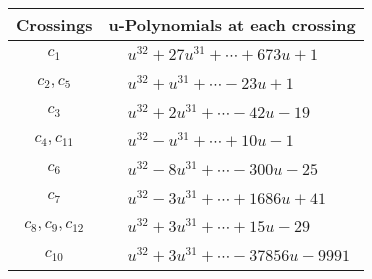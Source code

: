 \documentclass[1p]{elsarticle_modified}
\theoremstyle{definition}
\begin{document}
\begin{tabular}{m{50pt}|m{274pt}}
Crossings & \hspace{64pt}u-Polynomials at each crossing \\
\hline $$\begin{aligned}c_{1}\end{aligned}$$&$\begin{aligned}
&u^{32}+27 u^{31}+\cdots+673 u+1
\end{aligned}$\\
\hline $$\begin{aligned}c_{2},c_{5}\end{aligned}$$&$\begin{aligned}
&u^{32}+u^{31}+\cdots-23 u+1
\end{aligned}$\\
\hline $$\begin{aligned}c_{3}\end{aligned}$$&$\begin{aligned}
&u^{32}+2 u^{31}+\cdots-42 u-19
\end{aligned}$\\
\hline $$\begin{aligned}c_{4},c_{11}\end{aligned}$$&$\begin{aligned}
&u^{32}- u^{31}+\cdots+10 u-1
\end{aligned}$\\
\hline $$\begin{aligned}c_{6}\end{aligned}$$&$\begin{aligned}
&u^{32}-8 u^{31}+\cdots-300 u-25
\end{aligned}$\\
\hline $$\begin{aligned}c_{7}\end{aligned}$$&$\begin{aligned}
&u^{32}-3 u^{31}+\cdots+1686 u+41
\end{aligned}$\\
\hline $$\begin{aligned}c_{8},c_{9},c_{12}\end{aligned}$$&$\begin{aligned}
&u^{32}+3 u^{31}+\cdots+15 u-29
\end{aligned}$\\
\hline $$\begin{aligned}c_{10}\end{aligned}$$&$\begin{aligned}
&u^{32}+3 u^{31}+\cdots-37856 u-9991
\end{aligned}$\\
\hline
\end{tabular}\\~\\
\end{document}
